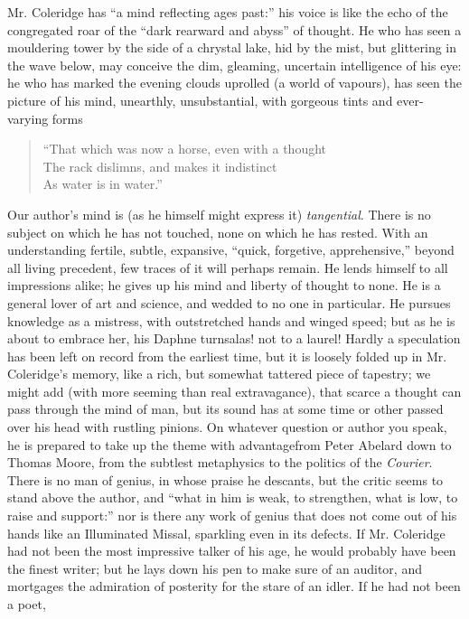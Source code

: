 Mr. Coleridge has ``a mind reflecting ages past:'' his voice is like
the echo of the congregated roar of the ``dark rearward and abyss''
of thought. He who has seen a mouldering tower by the side of a
chrystal lake, hid by the mist, but glittering in the wave below,
may conceive the dim, gleaming, uncertain intelligence of his eye:
he who has marked the evening clouds uprolled (a world of
vapours), has seen the picture of his mind, unearthly,
unsubstantial, with gorgeous tints and ever-varying forms\textemdash 
\begin{quote}
  ``That which was now a horse, even with a thought\\
  The rack dislimns, and makes it indistinct\\
  As water is in water.''
\end{quote}
Our author's mind is (as he himself might express it)
\emph{tangential}.  There is no subject on which he has not touched,
none on which he has rested. With an understanding fertile,
subtle, expansive, ``quick, forgetive, apprehensive,'' beyond all
living precedent, few traces of it will perhaps remain. He lends
himself to all impressions alike; he gives up his mind and liberty
of thought to none. He is a general lover of art and science, and
wedded to no one in particular. He pursues knowledge as a
mistress, with outstretched hands and winged speed; but as he is
about to embrace her, his Daphne turns\textemdash alas! not to a laurel!
Hardly a speculation has been left on record from the earliest
time, but it is loosely folded up in Mr. Coleridge's memory, like
a rich, but somewhat tattered piece of tapestry; we might add
(with more seeming than real extravagance), that scarce a thought
can pass through the mind of man, but its sound has at some time
or other passed over his head with rustling pinions. On whatever
question or author you speak, he is prepared to take up the theme
with advantage\textemdash from Peter Abelard down to Thomas Moore, from the
subtlest metaphysics to the politics of the \emph{Courier}. There is no
man of genius, in whose praise he descants, but the critic seems
to stand above the author, and ``what in him is weak, to
strengthen, what is low, to raise and support:'' nor is there any
work of genius that does not come out of his hands like an
Illuminated Missal, sparkling even in its defects. If
Mr. Coleridge had not been the most impressive talker of his age,
he would probably have been the finest writer; but he lays down
his pen to make sure of an auditor, and mortgages the admiration
of posterity for the stare of an idler. If he had not been a poet,
